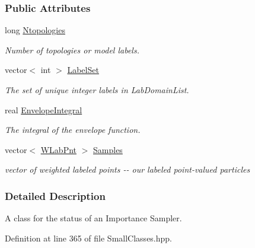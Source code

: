 \subsubsection*{\-Public \-Attributes}
\begin{DoxyCompactItemize}
\item 
long \hyperlink{classISSample_a83dec86101f85594fee6ed9f55954445}{\-Ntopologies}
\begin{DoxyCompactList}\small\item\em \-Number of topologies or model labels. \end{DoxyCompactList}\item 
vector$<$ int $>$ \hyperlink{classISSample_a7aeb58094643516127d1df6fe71fec3c}{\-Label\-Set}
\begin{DoxyCompactList}\small\item\em \-The set of unique integer labels in \-Lab\-Domain\-List. \end{DoxyCompactList}\item 
real \hyperlink{classISSample_a72e8c06106f7b47f432f2fcbf9bc80bd}{\-Envelope\-Integral}
\begin{DoxyCompactList}\small\item\em \-The integral of the envelope function. \end{DoxyCompactList}\item 
vector$<$ \hyperlink{classWLabPnt}{\-W\-Lab\-Pnt} $>$ \hyperlink{classISSample_a07b1930fbb119b2561e1ad4fdd760e0f}{\-Samples}
\begin{DoxyCompactList}\small\item\em vector of weighted labeled points -\/-\/ our labeled point-\/valued particles \end{DoxyCompactList}\end{DoxyCompactItemize}


\subsubsection{\-Detailed \-Description}
\-A class for the status of an \-Importance \-Sampler. 

\-Definition at line 365 of file \-Small\-Classes.\-hpp.



